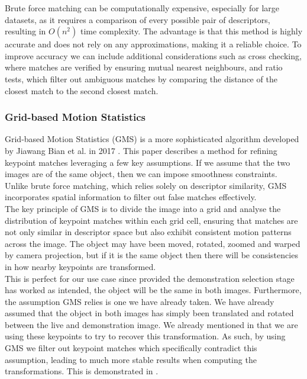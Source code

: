 Brute force matching can be computationally expensive, especially for large datasets, as it requires a comparison of every possible pair of descriptors, resulting in $O(n^2)$ time complexity. The advantage is that this method is highly accurate and does not rely on any approximations, making it a reliable choice. To improve accuracy we can include additional considerations such as cross checking, where matches are verified by ensuring mutual nearest neighbours, and ratio tests, which filter out ambiguous matches by comparing the distance of the closest match to the second closest match.

\subsubsection{Grid-based Motion Statistics}
Grid-based Motion Statistics (GMS) is a more sophisticated algorithm developed by Jiawang Bian et al. in 2017 \cite{GMS}. This paper describes a method for refining keypoint matches leveraging a few key assumptions. If we assume that the two images are of the same object, then we can impose smoothness constraints. Unlike brute force matching, which relies solely on descriptor similarity, GMS incorporates spatial information to filter out false matches effectively.\\

The key principle of GMS is to divide the image into a grid and analyse the distribution of keypoint matches within each grid cell, ensuring that matches are not only similar in descriptor space but also exhibit consistent motion patterns across the image. The object may have been moved, rotated, zoomed and warped by camera projection, but if it is the same object then there will be consistencies in how nearby keypoints are transformed.\\

This is perfect for our use case since provided the demonstration selection stage has worked as intended, the object will be the same in both images. Furthermore, the assumption GMS relies is one we have already taken. We have already assumed that the object in both images has simply been translated and rotated between the live and demonstration image. We already mentioned in  that we are using these keypoints to try to recover this transformation. As such, by using GMS we filter out keypoint matches which specifically contradict this assumption, leading to much more stable results when computing the transformations. This is demonstrated in .

